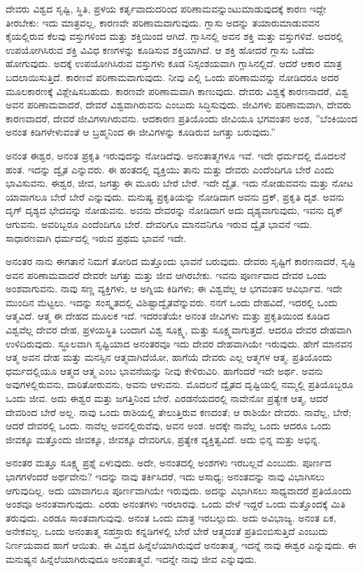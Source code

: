 ದೇವರು ವಿಶ್ವದ ಸೃಷ್ಟಿ, ಸ್ಥಿತಿ, ಪ್ರಳಯ ಕರ್ತೃವಾದುದರಿಂದ ಪರಿಣಾಮವನ್ನುಂಟುಮಾಡುವುದಕ್ಕೆ ಕಾರಣ ಇದ್ದೇ ತೀರಬೇಕು: ಇದು ಮಾತ್ರವಲ್ಲ, ಕಾರಣವೇ ಪರಿಣಾಮವಾಗುವುದು. ಗ್ಲಾಸು ಅದನ್ನು ತಯಾರುಮಾಡುವವನ ಕೈಯಲ್ಲಿರುವ ಕೆಲವು ವಸ್ತುಗಳಿಂದ ಮತ್ತು ಶಕ್ತಿಯಿಂದ ಆಗಿದೆ. ಗ್ಲಾಸಿನಲ್ಲಿ ಅವನ ಶಕ್ತಿ ಮತ್ತು ವಸ್ತುಗಳಿವೆ. ಅದರಲ್ಲಿ ಉಪಯೋಗಿಸಿರುವ ಶಕ್ತಿ ವಿವಿಧ ಕಣಗಳನ್ನು ಕೂಡಿಸುವ ಶಕ್ತಿಯಾಗಿದೆ. ಆ ಶಕ್ತಿ ಹೋದರೆ ಗ್ಲಾಸು ಒಡೆದು ಹೋಗುವುದು. ಅದಕ್ಕೆ ಉಪಯೋಗಿಸಿರುವ ವಸ್ತುಗಳು ಕೂಡ ನಿಸ್ಸಂಶಯವಾಗಿ ಗ್ಲಾಸಿನಲ್ಲಿದೆ. ಆದರೆ ಆಕಾರ ಮಾತ್ರ ಬದಲಾಯಿಸುತ್ತಿದೆ. ಕಾರಣವೆ ಪರಿಣಾಮವಾಗುವುದು. ನೀವು ಎಲ್ಲಿ ಒಂದು ಪರಿಣಾಮವನ್ನು ನೋಡಿದರೂ ಅದರ ಮೂಲಕಾರಣಕ್ಕೆ ವಿಶ್ಲೇಷಿಸಬಹುದು. ಕಾರಣವೇ ಪರಿಣಾಮವಾಗಿ ಕಾಣುವುದು. ದೇವರು ವಿಶ್ವಕ್ಕೆ ಕಾರಣನಾದರೆ, ವಿಶ್ವ ಅವನ ಪರಿಣಾಮವಾದರೆ, ದೇವರೆ ವಿಶ್ವವಾಗಿರುವನು ಎಂಬುದು ಸಿದ್ಧಿಸುವುದು. ಜೀವಿಗಳು ಪರಿಣಾಮವಾಗಿ, ದೇವರು ಕಾರಣವಾದರೆ, ದೇವರೆ ಜೀವಿಗಳಾಗಿರುವನು. ಆದಕಾರಣ ಪ್ರತಿಯೊಂದು ಜೀವಿಯೂ ಭಗವಂತನ ಅಂಶ, ''ಬೆಂಕಿಯಿಂದ ಅನಂತ ಕಿಡಿಗಳೇಳುವಂತೆ ಆ ಬ್ರಹ್ಮನಿಂದ ಈ ಜೀವಿಗಳನ್ನು ಕೂಡಿರುವ ಜಗತ್ತು ಬರುವುದು.”

ಅನಂತ ಈಶ್ವರ, ಅನಂತ ಪ್ರಕೃತಿ ಇರುವುದನ್ನು ನೋಡಿದೆವು. ಅನಂತಾತ್ಮಗಳೂ ಇವೆ. ಇದೇ ಧರ್ಮದಲ್ಲಿ ಮೊದಲನೆ ಹಂತ. ಇದನ್ನು ದ್ವೈತ ಎನ್ನುವರು. ಈ ಹಂತದಲ್ಲಿ ವ್ಯಕ್ತಿಯು ತಾನು ಮತ್ತು ದೇವರು ಎಂದೆಂದಿಗೂ ಬೇರೆ ಎಂದು ಭಾವಿಸುವನು. ಈಶ್ವರ, ಜೀವ, ಜಗತ್ತು ಈ ಮೂರು ಬೇರೆ ಬೇರೆ. ಇದೇ ದ್ವೈತ. ಇದು ನೋಡುವವನು ಮತ್ತು ನೋಟ ಯಾವಾಗಲೂ ಬೇರೆ ಬೇರೆ ಎನ್ನುವುದು. ಮನುಷ್ಯ ಪ್ರಕೃತಿಯನ್ನು ನೋಡಿದಾಗ ಅವನು ದ್ರಕ್, ಪ್ರಕೃತಿ ದೃಶ. ಅವನು ದೃಗ್ ದೃಶ್ಯದ ಭೇದವನ್ನು ನೋಡುವನು. ಅವನು ದೇವರನ್ನು ನೋಡಿದಾಗ ಅದು ದೃಶ್ಯವಾಗುವುದು, ಇವನು ದೃಕ್ ಆಗುವನು. ಅವರಿಬ್ಬರೂ ಎಂದೆಂದಿಗೂ ಬೇರೆ. ದೇವರಿಗೂ ಮಾನವನಿಗೂ ಇರುವ ದ್ವೈತ ಭಾವನೆ ಇದು. ಸಾಧಾರಣವಾಗಿ ಧರ್ಮದಲ್ಲಿ ಇರುವ ಪ್ರಥಮ ಭಾವನೆ ಇದೇ.

ಅನಂತರ ನಾನು ಈಗತಾನೆ ನಿಮಗೆ ತೋರಿದ ಮತ್ತೊಂದು ಭಾವನೆ ಬರುವುದು. ದೇವರು ಸೃಷ್ಟಿಗೆ ಕಾರಣನಾದರೆ, ಸೃಷ್ಟಿ ಅವನ ಪರಿಣಾಮವಾದರೆ ದೇವರೇ ಜಗತ್ತು ಮತ್ತು ಜೀವ ಆಗಿರಬೇಕು. ಇವನು ಪೂರ್ಣವಾದ ದೇವರ ಒಂದು ಅಂಶವಾಗುವನು. ನಾವು ಸಣ್ಣ ವ್ಯಕ್ತಿಗಳು, ಆ ಅಗ್ನಿಯ ಕಿಡಿಗಳು; ಈ ವಿಶ್ವವೆಲ್ಲ ಆ ಭಗವಂತನ ಆವಿರ್ಭಾವ. ಇದೇ ಮುಂದಿನ ಮೆಟ್ಟಲು. ಇದನ್ನು ಸಂಸ್ಕೃತದಲ್ಲಿ ವಿಶಿಷ್ಟಾದ್ವೈತವೆನ್ನುವರು. ನನಗೆ ಒಂದು ದೇಹವಿದೆ, ಇದರಲ್ಲಿ ಒಂದು ಆತ್ಮವಿದೆ. ಆತ್ಮ ಈ ದೇಹದ ಮೂಲಕ ಇದೆ. ಇದರಂತೆಯೇ ಅನಂತ ಜೀವಿಗಳು ಮತ್ತು ಪ್ರಕೃತಿಯಿಂದ ಕೂಡಿದ ವಿಶ್ವವೆಲ್ಲ ದೇವರ ದೇಹ, ಪ್ರಳಯಸ್ಥಿತಿ ಬಂದಾಗ ವಿಶ್ವ ಸೂಕ್ಷ್ಮ, ಮತ್ತು ಸೂಕ್ಷ್ಮವಾಗುತ್ತದೆ. ಆದರೂ ದೇವರ ದೇಹವಾಗಿ ಉಳಿದಿರುವುದು. ಸ್ಥೂಲವಾಗಿ ಸೃಷ್ಟಿಯಾದ ಅನಂತರವೂ ಇದು ದೇವರ ದೇಹವಾಗಿಯೇ ಇರುವುದು. ಹೇಗೆ ಮಾನವನ ಆತ್ಮ ಅವನ ದೇಹ ಮತ್ತು ಮನಸ್ಸಿನ ಆತ್ಮವಾಗಿದೆಯೋ, ಹಾಗೆಯೆ ದೇವರು ಎಲ್ಲ ಆತ್ಮಗಳ ಆತ್ಮ. ಪ್ರತಿಯೊಂದು ಧರ್ಮದಲ್ಲಿಯೂ ಆತ್ಮದ ಆತ್ಮ ಎಂಬ ಭಾವನೆಯನ್ನು ನೀವು ಕೇಳಿರುವಿರಿ. ಹಾಗೆಂದರೆ ಇದೇ ಅರ್ಥ. ಅವನು ಅವುಗಳಲ್ಲಿರುವನು, ದಾರಿತೋರುವನು, ಅವನು ಆಳುವನು. ಮೊದಲನೆ ದ್ವೈತದ ದೃಷ್ಟಿಯಲ್ಲಿ ನಮ್ಮಲ್ಲಿ ಪ್ರತಿಯೊಬ್ಬರೂ ಒಂದು ಜೀವ. ಅದು ಈಶ್ವರ ಮತ್ತು ಜಗತ್ತಿನಿಂದ ಬೇರೆ. ಎರಡನೆಯದರಲ್ಲಿ ನಾವೇನೋ ಪ್ರತ್ಯೇಕ ಆತ್ಮ, ಆದರೆ ದೇವರಿಂದ ಬೇರೆ ಅಲ್ಲ. ನಾವು ಒಂದು ರಾಶಿಯಲ್ಲಿ ತೇಲುತ್ತಿರುವ ಕಣದಂತೆ; ಆ ರಾಶಿಯೇ ದೇವರು. ನಾವೆಲ್ಲ, ಬೇರೆ; ಆದರೆ ದೇವರಲ್ಲಿ ಒಂದು. ನಾವೆಲ್ಲ ಅವನಲ್ಲಿರುವೆವು, ಅವನ ಅಂಶ. ಅದಕ್ಕೇ ನಾವೆಲ್ಲ ಒಂದು ಆದರೂ ಒಂದು ಜೀವಕ್ಕೂ ಮತ್ತೊಂದು ಜೀವಕ್ಕೂ, ಜೀವಕ್ಕೂ ದೇವರಿಗೂ, ಪ್ರತ್ಯೇಕ ವ್ಯಕ್ತಿತ್ವವಿದೆ. ಅದು ಭಿನ್ನ ಮತ್ತು ಅಭಿನ್ನ.

ಅನಂತರ ಮತ್ತೂ ಸೂಕ್ಷ್ಮ ಪ್ರಶ್ನೆ ಏಳುವುದು. ಅದೇ, ಅನಂತದಲ್ಲಿ ಅಂಶಗಳು ಇರಬಲ್ಲವೆ ಎಂಬುದು. ಪೂರ್ಣದ ಭಾಗಗಳೆಂದರೆ ಅರ್ಥವೇನು? ಇದನ್ನು ನಾವು ತರ್ಕಿಸಿದರೆ, ಇದು ಅಸಾಧ್ಯ; ಅನಂತವನ್ನು ನಾವು ವಿಭಾಗಿಸಲು ಆಗುವುದಿಲ್ಲ. ಅದು ಯಾವಾಗಲೂ ಪೂರ್ಣವಾಗಿಯೇ ಇರುವುದು. ಅದನ್ನು ವಿಭಾಗಿಸಲು ಸಾಧ್ಯವಾದರೆ ಪ್ರತಿಯೊಂದು ಅಂಶವೂ ಅನಂತವಾಗುವುದು. ಎರಡು ಅನಂತಗಳು ಇರಲಾರವು. ಒಂದು ವೇಳೆ ಇದ್ದರೆ ಒಂದು ಮತ್ತೊಂದಕ್ಕೆ ಮಿತಿ ತರುವುದು. ಎರಡೂ ಸಾಂತವಾಗುವುವು. ಅನಂತ ಒಂದು ಮಾತ್ರ ಇರಬಲ್ಲುದು. ಅದು ಅವಿಭಾಜ್ಯ. ಅನಂತ ಏಕ, ಅನೇಕವಲ್ಲ. ಒಂದು ಅನಂತಾತ್ಮ ಸಹಸ್ರಾರು ಕನ್ನಡಿಗಳಲ್ಲಿ ಬೇರೆ ಬೇರೆ ಆತ್ಮದಂತೆ ಪ್ರತಿಬಿಂಬಿಸುತ್ತಿದೆ ಎಂಬುದು ನಿರ್ಣಯವಾದ ಹಾಗೆ ಆಯಿತು. ಈ ವಿಶ್ವದ ಹಿನ್ನೆಲೆಯಾಗಿರುವುದೆ ಅನಂತಾತ್ಮ, ಇದನ್ನೆ ನಾವು ಈಶ್ವರ ಎನ್ನುವುದು. ಈ ಮನುಷ್ಯನ ಹಿನ್ನೆಲೆಯಾಗಿರುವುದೂ ಅನಂತಾತ್ಮವೆ. ಇದನ್ನೇ ನಾವು ಜೀವ ಎನ್ನುವುದು.

